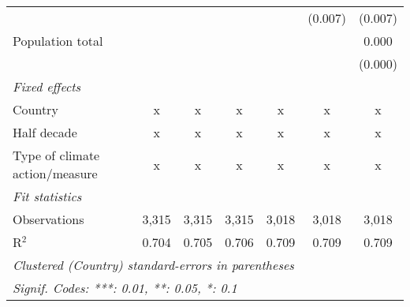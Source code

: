 \begin{tabular}{lcccccc}
                                            &               &                &               &               & (0.007)       & (0.007)\\   
   Population total                         &               &                &               &               &               & 0.000\\   
                                            &               &                &               &               &               & (0.000)\\   
   \emph{Fixed effects}\\
   Country                                  & x             & x              & x             & x             & x             & x\\  
   Half decade                              & x             & x              & x             & x             & x             & x\\  
   Type of climate action/measure           & x             & x              & x             & x             & x             & x\\  
   \midrule \emph{Fit statistics}\\
   Observations                             & 3,315         & 3,315          & 3,315         & 3,018         & 3,018         & 3,018\\  
   R$^2$                                    & 0.704         & 0.705          & 0.706         & 0.709         & 0.709         & 0.709\\  
   \midrule
   \multicolumn{7}{l}{\emph{Clustered (Country) standard-errors in parentheses}}\\
   \multicolumn{7}{l}{\emph{Signif. Codes: ***: 0.01, **: 0.05, *: 0.1}}\\
\end{tabular}
\par\endgroup


